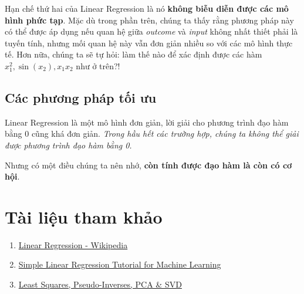 Hạn chế thứ hai của Linear Regression là nó \textbf{không biễu diễn được các mô hình phức tạp}. Mặc dù trong phần trên, chúng ta thấy rằng phương pháp này có thể được áp dụng nếu quan hệ giữa \textit{outcome} và \textit{input} không nhất thiết phải là tuyến tính, nhưng mối quan hệ này vẫn đơn giản nhiều so với các mô hình thực tế. Hơn nữa, chúng ta sẽ tự hỏi: làm thế nào để xác định được các hàm $x_1^2, \sin(x_2), x_1x_2$ như ở trên?! 
 
 
\subsection{Các phương pháp tối ưu}
Linear Regression là một mô hình đơn giản, lời giải cho phương trình đạo hàm bằng 0 cũng khá đơn giản. \textit{Trong hầu hết các trường hợp, chúng ta không thể giải được phương trình đạo hàm bằng 0.} 
 
Nhưng có một điều chúng ta nên nhớ, \textbf{còn tính được đạo hàm là còn có cơ hội}. 
 
 
 
 
\section{Tài liệu tham khảo}
 \begin{enumerate}
 	\item  \href{https://en.wikipedia.org/wiki/Linear_regression}{Linear Regression - Wikipedia}

 	\item  \href{http://machinelearningmastery.com/simple-linear-regression-tutorial-for-machine-learning/}{Simple Linear Regression Tutorial for Machine Learning} 

 	\item  \href{http://www.sci.utah.edu/~gerig/CS6640-F2012/Materials/pseudoinverse-cis61009sl10.pdf}{Least Squares, Pseudo-Inverses, PCA \& SVD} 
 \end{enumerate}
